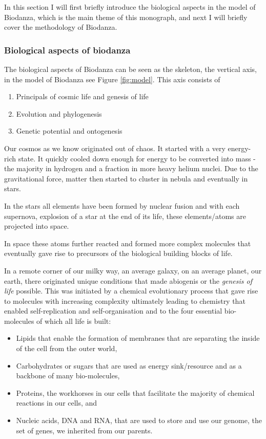 \documentclass[
]{article}
\providecommand{\tightlist}{%
  \setlength{\itemsep}{0pt}\setlength{\parskip}{0pt}}
\begin{document}
In this section I will first briefly introduce the biological aspects in the model of Biodanza, which is the main theme of this monograph, and next I will briefly cover the methodology of Biodanza.

\hypertarget{biological-aspects-of-biodanza}{%
\subsubsection{Biological aspects of biodanza}\label{biological-aspects-of-biodanza}}

The biological aspects of Biodanza can be seen as the skeleton, the vertical axis, in the model of Biodanza see Figure \ref{fig:model}. This axis consists of

\begin{enumerate}
\def\labelenumi{\arabic{enumi}.}
\tightlist
\item
  Principals of cosmic life and genesis of life
\item
  Evolution and phylogenesis
\item
  Genetic potential and ontogenesis
\end{enumerate}

Our cosmos as we know originated out of chaos. It started with a very energy-rich state. It quickly cooled down enough for energy to be converted into mass - the majority in hydrogen and a fraction in more heavy helium nuclei. Due to the gravitational force, matter then started to cluster in nebula and eventually in stars.

In the stars all elements have been formed by nuclear fusion and with each supernova, explosion of a star at the end of its life, these elements/atoms are projected into space.

In space these atoms further reacted and formed more complex molecules that eventually gave rise to precursors of the biological building blocks of life.

In a remote corner of our milky way, an average galaxy, on an average planet, our earth, there originated unique conditions that made abiogenis or the \emph{genesis of life} possible.
This was initiated by a chemical evolutionary process that gave rise to molecules with increasing complexity ultimately leading to chemistry that enabled self-replication and self-organisation and to the four essential bio-molecules of which all life is built:

\begin{itemize}
\tightlist
\item
  Lipids that enable the formation of membranes that are separating the inside of the cell from the outer world,
\item
  Carbohydrates or sugars that are used as energy sink/resource and as a backbone of many bio-molecules,
\item
  Proteins, the workhorses in our cells that facilitate the majority of chemical reactions in our cells, and
\item
  Nucleic acids, DNA and RNA, that are used to store and use our genome, the set of genes, we inherited from our parents.
\end{itemize}
\end{document}
